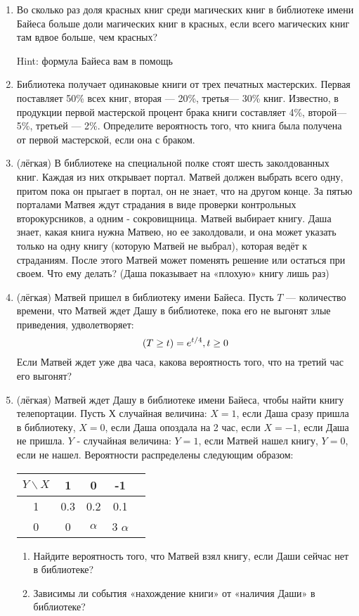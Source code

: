 \documentclass[a4paper,12pt]{article}
\let\P\relax
\DeclareMathOperator{\P}{\mathbb{P}}
\begin{document}
\begin{enumerate} %
\item
Во сколько раз доля красных книг среди магических книг в библиотеке имени Байеса
больше доли магических книг в красных, если всего магических книг
там вдвое больше, чем красных?

Hint: формула Байеса вам в помощь
\item
Библиотека получает одинаковые книги от трех печатных мастерских. Первая поставляет 50\% всех книг, вторая — 20\%, третья— 30\% книг.
Известно, в продукции первой мастерской процент брака книги составляет 4\%, второй— 5\%, третьей — 2\%. Определите вероятность того, что книга была получена от первой мастерской, если она с браком.
\item (лёгкая)
В библиотеке на специальной полке стоят шесть заколдованных книг. Каждая из них открывает портал. Матвей должен выбрать всего одну, притом пока он прыгает в портал, он не знает, что на другом конце. За пятью порталами Матвея ждут страдания в виде проверки контрольных второкурсников, а одним - сокровищница. Матвей выбирает книгу. Даша знает, какая книга нужна Матвею, но ее заколдовали, и она может указать только на одну книгу  (которую Матвей не выбрал), которая ведёт к страданиям. После этого Матвей может поменять решение или остаться при своем. Что ему делать? (Даша показывает на «плохую» книгу лишь раз)
\item (лёгкая)
Матвей пришел в библиотеку имени Байеса. Пусть $T$ — количество времени, что Матвей ждет Дашу в библиотеке, пока его не выгонят злые приведения, удволетворяет:
\[
\P(T \ge t) = e^{t/4}, t\ge 0
\]
Если Матвей ждет уже два часа, какова вероятность того, что на третий час его выгонят?
\item (лёгкая)
Матвей ждет Дашу в библиотеке имени Байеса, чтобы найти книгу телепортации. Пусть $Х$ случайная величина: $X = 1$, если Даша сразу пришла в библиотеку, $X = 0$, если Даша опоздала на 2 час, если $X=-1$, если Даша не пришла. $Y$ - случайная величина: $Y=1$, если Матвей нашел книгу, $Y=0$, если не нашел. Вероятности распределены следующим образом:
\begin{center}
	\begin{tabular}{ccccc}
		\toprule
		$Y\backslash X$ & 1 & 0 & -1\\
		\midrule
		1 & 0.3 & 0.2& 0.1\\
		0 & 0  & $\alpha$ & 3 $\alpha$ \\
		\bottomrule
	\end{tabular}
\end{center}

\begin{enumerate}
    \item Найдите вероятность того, что Матвей взял книгу, если Даши сейчас нет в библиотеке?
    \item Зависимы ли события «нахождение книги» от «наличия Даши» в библиотеке?
\end{enumerate}

\end{enumerate}
\end{document}
